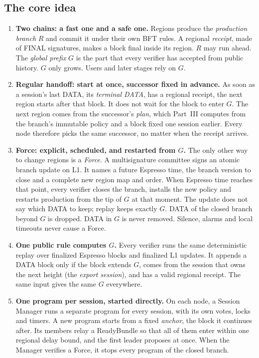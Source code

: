 \documentclass[11pt,a4paper]{article}
\newcommand{\defterm}[1]{\textcolor{rrBlue}{\textit{#1}}}
\begin{document}
\subsection{The core idea}
\label{sec:core-idea}
\begin{mdframed}[linewidth=.6pt,backgroundcolor=rrBlue!4,nobreak=true,
innertopmargin=6pt,innerbottommargin=6pt]
\begin{enumerate}[label=\textbf{\arabic*.},itemsep=4pt]
\item \textbf{Two chains: a fast one and a safe one.} Regions produce the
\defterm{production branch} $R$ and commit it under their own BFT rules.
A regional \emph{receipt}, made of FINAL signatures, makes a block final
inside its region. $R$ may run ahead. The \defterm{global prefix} $G$ is
the part that every verifier has accepted from public history. $G$ only
grows. Users and later stages rely on $G$.
\item \textbf{Regular handoff: start at once, successor fixed in
advance.} As soon as a session's last DATA, its \emph{terminal DATA}, has
a regional receipt, the next region starts after that block. It does not
wait for the block to enter $G$. The next region comes from the
successor's \emph{plan}, which Part~III computes from the branch's
immutable policy and a block fixed one session earlier. Every node
therefore picks the same successor, no matter when the receipt arrives.
\item \textbf{Force: explicit, scheduled, and restarted from $G$.} The
only other way to change regions is a \defterm{Force}. A multisignature
committee signs an atomic branch update on L1. It names a future Espresso
time, the branch version to close and a complete new region map and order. When
Espresso time reaches that point, every verifier closes the branch,
installs the new policy and restarts production from the tip of $G$ at that
moment. The update does not say which DATA to keep; replay keeps exactly
$G$. DATA of the closed branch beyond $G$ is dropped. DATA in $G$ is never
removed. Silence, alarms and local timeouts never cause a Force.
\item \textbf{One public rule computes $G$.} Every verifier runs the same
deterministic replay over finalized Espresso blocks and finalized L1
updates. It appends a DATA block only if the block extends $G$, comes
from the session that owns the next height (the \emph{export session}),
and has a valid regional receipt. The same input gives the same $G$
everywhere.
\item \textbf{One program per session, started directly.} On each node, a
Session Manager runs a separate program for every session, with its own
votes, locks and timers. A new program starts from a fixed
\emph{anchor}, the block it continues after. Its members relay a
ReadyBundle so that all of them enter within one regional delay bound,
and the first leader proposes at once. When the Manager verifies a
Force, it stops every program of the closed branch.
\end{enumerate}
\end{mdframed}
\end{document}
